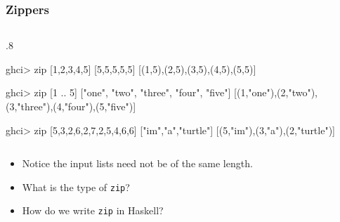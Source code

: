\documentclass{beamer}
\newenvironment{codeblock}[1][.8]{%
\begin{columns}
\begin{column}{#1\linewidth}
\begin{exampleblock}{}}{%
\end{exampleblock}
\end{column}
\end{columns}}
\begin{document}

\begin{frame}[fragile]
\frametitle{Zippers}

\begin{codeblock}
\begin{hcode}
ghci> zip [1,2,3,4,5] [5,5,5,5,5]  
[(1,5),(2,5),(3,5),(4,5),(5,5)]  

ghci> zip [1 .. 5] ["one", "two", "three", "four", "five"]  
[(1,"one"),(2,"two"),(3,"three"),(4,"four"),(5,"five")] 

ghci> zip [5,3,2,6,2,7,2,5,4,6,6] ["im","a","turtle"]  
[(5,"im"),(3,"a"),(2,"turtle")] 
\end{hcode}
\end{codeblock}

\begin{itemize}

\item Notice the input lists need not be of the same length.

\item What is the type of \verb+zip+?

\item How do we write \verb+zip+ in Haskell?

\end{itemize}

\end{frame}
\end{document}
